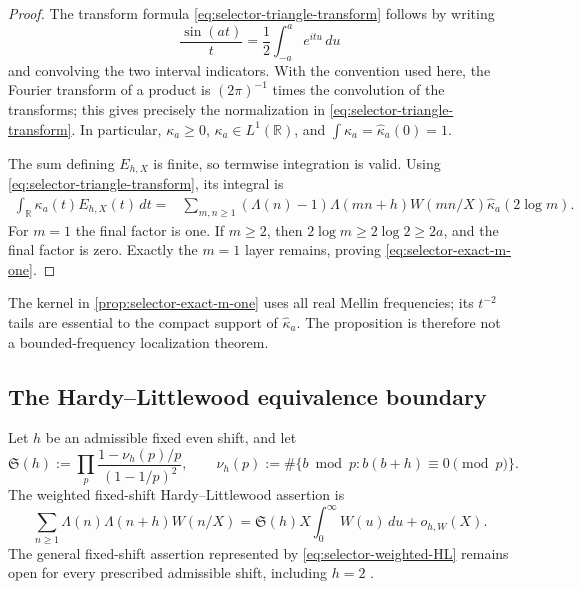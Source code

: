\begin{proof}
The transform formula \eqref{eq:selector-triangle-transform} follows by
writing
\[
 \frac{\sin(at)}t=\frac12\int_{-a}^{a}e^{itu}\,du
\]
and convolving the two interval indicators.  With the convention used
here, the Fourier transform of a product is $(2\pi)^{-1}$ times the
convolution of the transforms; this gives precisely the normalization in
\eqref{eq:selector-triangle-transform}.  In particular,
$\kappa_a\geq0$, $\kappa_a\in L^1(\mathbb R)$, and
$\int\kappa_a=\widehat\kappa_a(0)=1$.

The sum defining $E_{h,X}$ is finite, so termwise integration is valid.
Using \eqref{eq:selector-triangle-transform}, its integral is
\begin{align*}
 \int_{\mathbb R}\kappa_a(t)E_{h,X}(t)\,dt
 ={}&\sum_{m,n\geq1}(\Lambda(n)-1)\Lambda(mn+h)W(mn/X)
       \widehat\kappa_a(2\log m).
\end{align*}
For $m=1$ the final factor is one.  If $m\geq2$, then
$2\log m\geq2\log2\geq2a$, and the final factor is zero.  Exactly the
$m=1$ layer remains, proving \eqref{eq:selector-exact-m-one}.
\end{proof}

The kernel in \cref{prop:selector-exact-m-one} uses all real Mellin
frequencies; its $t^{-2}$ tails are essential to the compact support of
$\widehat\kappa_a$.  The proposition is therefore not a bounded-frequency
localization theorem.

\subsection{The Hardy--Littlewood equivalence boundary}
\label{subsec:selector-HL-boundary}

Let $h$ be an admissible fixed even shift, and let
\begin{equation}
 \mathfrak S(h)
 :=\prod_p\frac{1-\nu_h(p)/p}{(1-1/p)^2},
 \qquad
 \nu_h(p):=\#\{b\bmod p:b(b+h)\equiv0\pmod{p}\}.
 \label{eq:selector-singular-series}
\end{equation}
The weighted fixed-shift Hardy--Littlewood assertion is
\begin{equation}
 \sum_{n\geq1}\Lambda(n)\Lambda(n+h)W(n/X)
 =\mathfrak S(h)X\int_0^\infty W(u)\,du+o_{h,W}(X).
 \label{eq:selector-weighted-HL}
\end{equation}
The general fixed-shift assertion represented by
\eqref{eq:selector-weighted-HL} remains open for every prescribed
admissible shift, including $h=2$
\citep{HardyLittlewood1923,IwaniecKowalski2004}.


